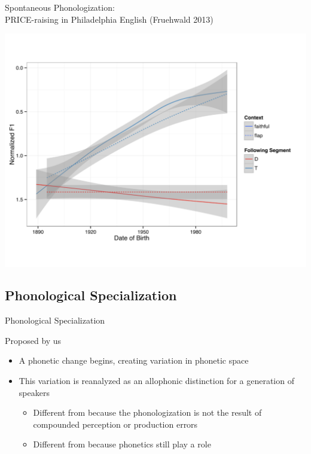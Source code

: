 \documentclass[hyperref={pdfpagelabels=false}]{beamer}
\begin{document}
\begin{frame}{Spontaneous Phonologization: \\ \small{PRICE-raising in Philadelphia English (Fruehwald 2013)}}

	
\begin{center}
\includegraphics[trim=2cm 2cm 2cm 2cm, clip=false, width=.8\textwidth]{ayraisingphila.pdf}
\end{center}

\end{frame}

\subsection{Phonological Specialization}

\begin{frame}{Phonological Specialization}

	Proposed by us \pause
	\begin{itemize}
		\item A phonetic change begins, creating variation in phonetic space \pause
		\item This variation is reanalyzed as an allophonic distinction for a generation of speakers \pause
		\begin{itemize}
				\item Different from \citep{Ohala1981} because the phonologization is not the result of compounded perception or production errors \pause
				\item Different from \citep{fruehwald2013, JandaJoseph2003} because phonetics still play a role 
		\end{itemize}
	\end{itemize}

\end{frame}
\end{document}
